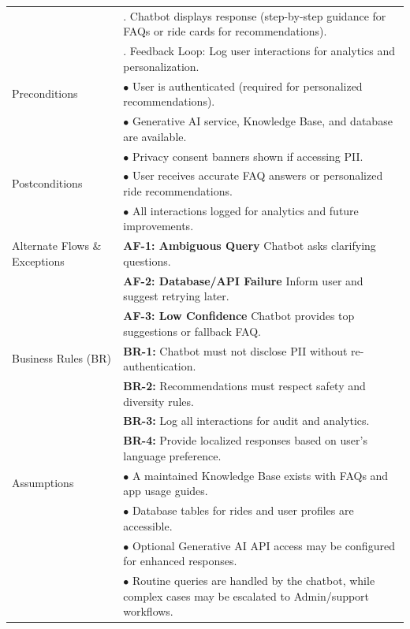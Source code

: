\begin{longtable}{|>{\raggedright\arraybackslash}p{4cm}|>{\raggedright\arraybackslash}p{11cm}|}
& 5. Chatbot displays response (step-by-step guidance for FAQs or ride cards for recommendations). \\
& 6. Feedback Loop: Log user interactions for analytics and personalization. \\
\hline
Preconditions & $\bullet$ User is authenticated (required for personalized recommendations). \\
& $\bullet$ Generative AI service, Knowledge Base, and database are available. \\
& $\bullet$ Privacy consent banners shown if accessing PII. \\
\hline
Postconditions & $\bullet$ User receives accurate FAQ answers or personalized ride recommendations. \\
& $\bullet$ All interactions logged for analytics and future improvements. \\
\hline
Alternate Flows \& Exceptions & \textbf{AF-1: Ambiguous Query} \newline Chatbot asks clarifying questions. \\
& \textbf{AF-2: Database/API Failure} \newline Inform user and suggest retrying later. \\
& \textbf{AF-3: Low Confidence} \newline Chatbot provides top suggestions or fallback FAQ. \\
\hline
Business Rules (BR) & \textbf{BR-1:} Chatbot must not disclose PII without re-authentication. \\
& \textbf{BR-2:} Recommendations must respect safety and diversity rules. \\
& \textbf{BR-3:} Log all interactions for audit and analytics. \\
& \textbf{BR-4:} Provide localized responses based on user's language preference. \\
\hline
Assumptions & $\bullet$ A maintained Knowledge Base exists with FAQs and app usage guides. \\
& $\bullet$ Database tables for rides and user profiles are accessible. \\
& $\bullet$ Optional Generative AI API access may be configured for enhanced responses. \\
& $\bullet$ Routine queries are handled by the chatbot, while complex cases may be escalated to Admin/support workflows. \\
\hline
\end{longtable}

